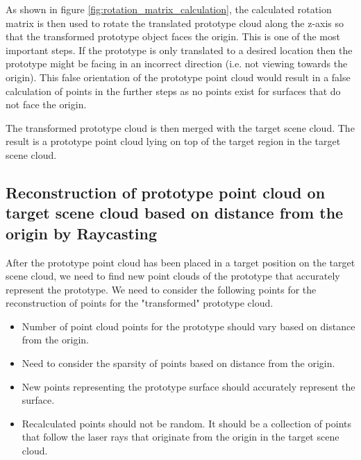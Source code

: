 As shown in figure \ref{fig:rotation_matrix_calculation}, the calculated rotation matrix is then used to rotate the translated prototype cloud along the z-axis so that the transformed prototype object faces the origin. This is one of the most important steps. If the prototype is only translated to a desired location then the prototype might be facing in an incorrect direction (i.e. not viewing towards the origin). This false orientation of the prototype point cloud would result in a false calculation of points in the further steps as no points exist for surfaces that do not face the origin.

The transformed prototype cloud is then merged with the target scene cloud. The result is a prototype point cloud lying on top of the target region in the target scene cloud.


\subsection{Reconstruction of prototype point cloud on target scene cloud based on distance from the origin by Raycasting}

After the prototype point cloud has been placed in a target position on the target scene cloud, we need to find new point clouds of the prototype that accurately represent the prototype. We need to consider the following points for the reconstruction of points for the "transformed" prototype cloud.
\begin{itemize}
    \item Number of point cloud points for the prototype should vary based on distance from the origin.
    \item Need to consider the sparsity of points based on distance from the origin.
    \item New points representing the prototype surface should accurately represent the surface.
    \item Recalculated points should not be random. It should be a collection of points that follow the laser rays that originate from the origin in the target scene cloud.
\end{itemize}


